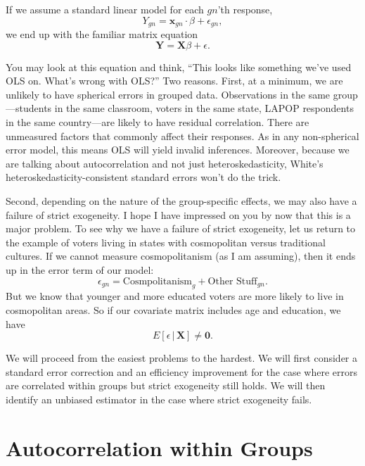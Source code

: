 \documentclass[
  12pt,
  oneside,openany]{book}
\begin{document}
If we assume a standard linear model for each \(gn\)'th response,
\[
Y_{gn} = \mathbf{x}_{gn} \cdot \beta + \epsilon_{gn},
\]
we end up with the familiar matrix equation
\[
\mathbf{Y} = \mathbf{X} \beta + \epsilon.
\]

You may look at this equation and think, ``This looks like something we've used OLS on. What's wrong with OLS?'' Two reasons. First, at a minimum, we are unlikely to have spherical errors in grouped data. Observations in the same group---students in the same classroom, voters in the same state, LAPOP respondents in the same country---are likely to have residual correlation. There are unmeasured factors that commonly affect their responses. As in any non-spherical error model, this means OLS will yield invalid inferences. Moreover, because we are talking about autocorrelation and not just heteroskedasticity, White's heteroskedasticity-consistent standard errors won't do the trick.

Second, depending on the nature of the group-specific effects, we may also have a failure of strict exogeneity. I hope I have impressed on you by now that this is a major problem. To see why we have a failure of strict exogeneity, let us return to the example of voters living in states with cosmopolitan versus traditional cultures. If we cannot measure cosmopolitanism (as I am assuming), then it ends up in the error term of our model:
\[
\epsilon_{gn} = \text{Cosmpolitanism}_g + \text{Other Stuff}_{gn}.
\]
But we know that younger and more educated voters are more likely to live in cosmopolitan areas. So if our covariate matrix includes age and education, we have
\[
E[\epsilon \,|\, \mathbf{X}] \neq \mathbf{0}.
\]

We will proceed from the easiest problems to the hardest. We will first consider a standard error correction and an efficiency improvement for the case where errors are correlated within groups but strict exogeneity still holds. We will then identify an unbiased estimator in the case where strict exogeneity fails.

\hypertarget{autocorrelation-within-groups}{%
\section{Autocorrelation within Groups}\label{autocorrelation-within-groups}}

\providecommand{\Cor}{\mathop{\rm Cor}\nolimits}
\providecommand{\se}{\mathop{\rm se}\nolimits}
\end{document}
